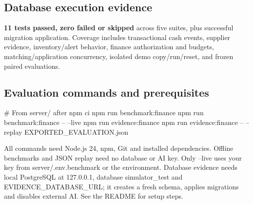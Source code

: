 \documentclass[10pt,a4paper]{article}
\begin{document}

\subsection*{Database execution evidence}

\textbf{11 tests passed, zero failed or skipped} across five suites, plus successful migration application. Coverage includes transactional cash events, supplier evidence, inventory/alert behavior, finance authorization and budgets, matching/application concurrency, isolated demo copy/run/reset, and frozen paired evaluations.



\clearpage


\subsection*{Evaluation commands and prerequisites}

\begin{CodeBlock}
# From server/ after npm ci
npm run benchmark:finance
npm run benchmark:finance -- --live
npm run evidence:finance
npm run evidence:finance -- --replay EXPORTED_EVALUATION.json
\end{CodeBlock}

All commands need Node.js 24, npm, Git and installed dependencies. Offline benchmarks and JSON replay need no database or AI key. Only --live uses your key from server/.env.benchmark or the environment. Database evidence needs local PostgreSQL at 127.0.0.1, database simulator\_test and EVIDENCE\_DATABASE\_URL; it creates a fresh schema, applies migrations and disables external AI. See the README for setup steps.
\end{document}
